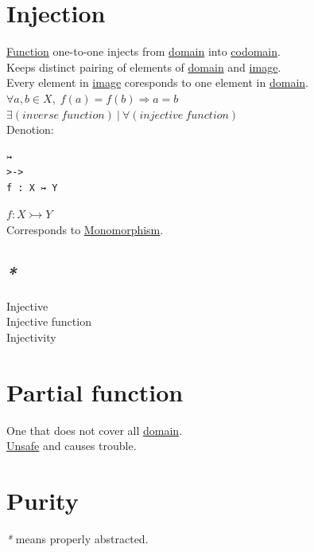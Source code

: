 \documentclass[a4paper,14pt,oneside]{book}
\begin{document}
\section{\label{org1f281ac}Injection}
\label{sec:org4f02fa7}
\hyperref[org8cc2ae4]{Function} one-to-one injects from \hyperref[orgeb6ec49]{domain} into \hyperref[org71c95ef]{codomain}.\\

Keeps distinct pairing of elements of \hyperref[orgeb6ec49]{domain} and \hyperref[orga531a2e]{image}.\\
Every element in \hyperref[orga531a2e]{image} coresponds to one element in \hyperref[orgeb6ec49]{domain}.\\

\(\forall a,b \in X, \; f(a)=f(b) \Rightarrow a=b\)\\

\(\exists (inverse \ function) \ | \ \forall (injective \ function)\)\\

Denotion:\\
\begin{verbatim}
↣
>->
f : X ↣ Y
\end{verbatim}
\(f : X \rightarrowtail Y\)\\

Corresponds to \hyperref[org19693aa]{Monomorphism}.\\

\subsection{\emph{*}}
\label{sec:orgf07d2cc}

\label{orgcdc23e2}Injective\\
\label{orga9fca33}Injective function\\
\label{orgbd2fc5a}Injectivity\\

\section{\label{orgc1ec8cb}Partial function}
\label{sec:orga875f27}
One that does not cover all \hyperref[orgeb6ec49]{domain}.\\
\hyperref[org1627611]{Unsafe} and causes trouble.\\

\section{\label{org9d7a756}Purity}
\label{sec:org441abaa}
\emph{*} means properly abstracted.\\
\end{document}
